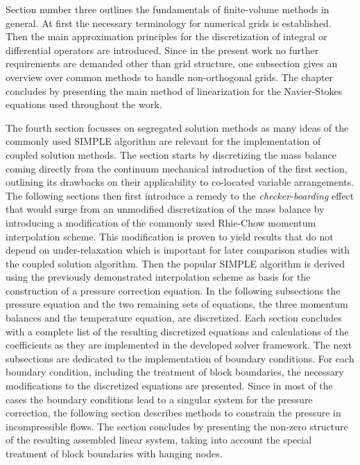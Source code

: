 Section number three outlines the fundamentals of finite-volume methods in general. At first the necessary terminology for numerical grids is established. Then the main approximation principles for the discretization of integral or differential operators are introduced. Since in the present work no further requirements are demanded other than grid structure, one subsection gives an overview over common methods to handle non-orthogonal grids. The chapter concludes by presenting the main method of linearization for the Navier-Stokes equations used throughout the work.

The fourth section focusses on segregated solution methods as many ideas of the commonly used SIMPLE algorithm are relevant for the implementation of coupled solution methods. The section starts by discretizing the mass balance coming directly from the continuum mechanical introduction of the first section, outlining its drawbacks on their applicability to co-located variable arrangements. The following sections then first introduce a remedy to the \emph{checker-boarding} effect that would surge from an unmodified discretization of the mass balance by introducing a modification of the commonly used Rhie-Chow \cite{rhie82} momentum interpolation scheme. This modification is proven to yield results that do not depend on under-relaxation which is important for later comparison studies with the coupled solution algorithm. Then the popular SIMPLE algorithm is derived using the previously demonstrated interpolation scheme as basis for the construction of a pressure correction equation. In the following subsections the pressure equation and the two remaining sets of equations, the three momentum balances and the temperature equation, are discretized. Each section concludes with a complete list of the resulting discretized equations and calculations of the coefficients as they are implemented in the developed solver framework. The next subsections are dedicated to the implementation of boundary conditions. For each boundary condition, including the treatment of block boundaries, the necessary modifications to the discretized equations are presented. Since in most of the cases the boundary conditions lead to a singular system for the pressure correction, the following section describes methods to constrain the pressure in incompressible flows. The section concludes by presenting the non-zero structure of the resulting assembled linear system, taking into account the special treatment of block boundaries with hanging nodes.

